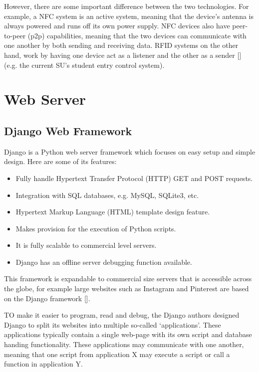 However, there are some important difference between the two technologies. For example, a NFC
system is  an active system, meaning that the device's antenna is always powered and runs off
its own  power supply. NFC devices also have peer-to-peer (p2p) capabilities, meaning that the
two  devices can communicate with one another by both sending and receiving data.
RFID systems on the  other hand, work by having one device act as a listener and the other as a
sender [\cite{article:diff-nfc-rfid}] (e.g. the current SU's student entry control system).

\section{Web Server}

\subsection{Django Web Framework}
\label{sec:django}

Django is a Python web server framework which focuses on easy setup and simple design. Here are
some of its features:

\begin{itemize}
  \item Fully handle Hypertext Transfer Protocol (HTTP) GET and POST requests.
  \item Integration with SQL databases, e.g. MySQL, SQLite3, etc.
  \item Hypertext Markup Language (HTML) template design feature.
  \item Makes provision for the execution of Python scripts.
  \item It is fully scalable to commercial level servers.
  \item Django has an offline server debugging function available.
\end{itemize}

This framework is expandable to commercial size servers that is accessible across the globe,
for example large websites such as Instagram and Pinterest are based on the Django framework
[\cite{website:django-sites}].

TO make it easier to program, read and debug, the Django authors designed Django to split its
websites into multiple so-called `applications'. These applications typically contain a single
web-page with its own script and database handing functionality. These applications may
communicate with one another, meaning that one script from application X may execute a script
or call a function in application Y.  


